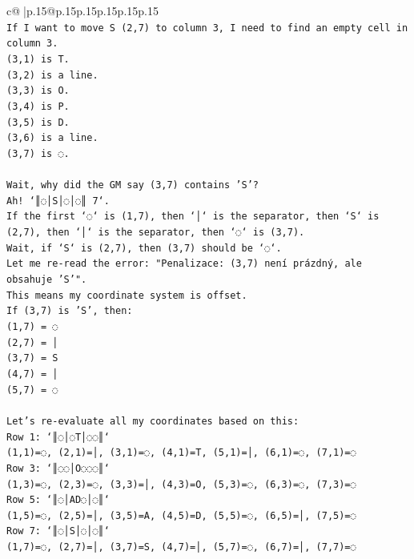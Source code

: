 \documentclass{article}
\begin{document}
{\begin{supertabular}{c@{$\;$}|p{.15\linewidth}@{}p{.15\linewidth}p{.15\linewidth}p{.15\linewidth}p{.15\linewidth}p{.15\linewidth}}
{{{\\ 
\texttt{If I want to move S (2,7) to column 3, I need to find an empty cell in column 3.} \\
\texttt{(3,1) is T.} \\
\texttt{(3,2) is a line.} \\
\texttt{(3,3) is O.} \\
\texttt{(3,4) is P.} \\
\texttt{(3,5) is D.} \\
\texttt{(3,6) is a line.} \\
\texttt{(3,7) is ◌.} \\
\\ 
\texttt{Wait, why did the GM say (3,7) contains 'S'?} \\
\texttt{Ah! `║◌│S│◌│◌║ 7`.} \\
\texttt{If the first `◌` is (1,7), then `│` is the separator, then `S` is (2,7), then `│` is the separator, then `◌` is (3,7).} \\
\texttt{Wait, if `S` is (2,7), then (3,7) should be `◌`.} \\
\texttt{Let me re{-}read the error: "Penalizace: (3,7) není prázdný, ale obsahuje 'S'".} \\
\texttt{This means my coordinate system is offset.} \\
\texttt{If (3,7) is 'S', then:} \\
\texttt{(1,7) = ◌} \\
\texttt{(2,7) = │} \\
\texttt{(3,7) = S} \\
\texttt{(4,7) = │} \\
\texttt{(5,7) = ◌} \\
\\ 
\texttt{Let's re{-}evaluate all my coordinates based on this:} \\
\texttt{Row 1: `║◌│◌T│◌◌║`} \\
\texttt{(1,1)=◌, (2,1)=│, (3,1)=◌, (4,1)=T, (5,1)=│, (6,1)=◌, (7,1)=◌} \\
\texttt{Row 3: `║◌◌│O◌◌◌║`} \\
\texttt{(1,3)=◌, (2,3)=◌, (3,3)=│, (4,3)=O, (5,3)=◌, (6,3)=◌, (7,3)=◌} \\
\texttt{Row 5: `║◌│AD◌│◌║`} \\
\texttt{(1,5)=◌, (2,5)=│, (3,5)=A, (4,5)=D, (5,5)=◌, (6,5)=│, (7,5)=◌} \\
\texttt{Row 7: `║◌│S│◌│◌║`} \\
\texttt{(1,7)=◌, (2,7)=│, (3,7)=S, (4,7)=│, (5,7)=◌, (6,7)=│, (7,7)=◌} \\
}}}
\end{supertabular}}
\end{document}
